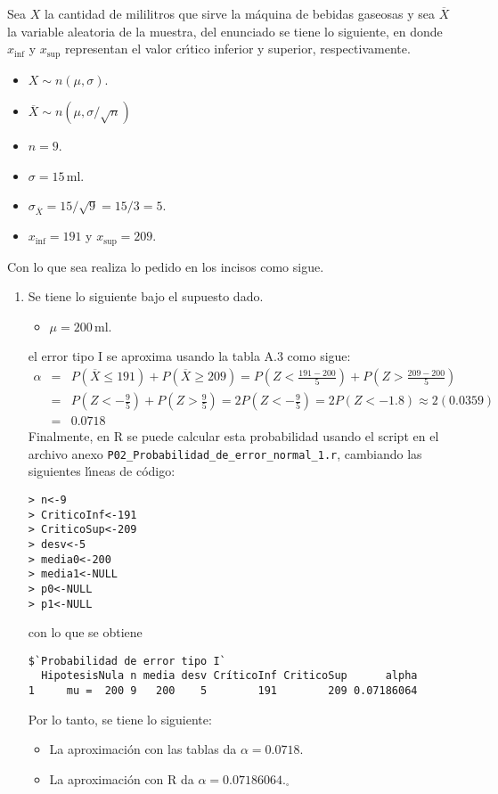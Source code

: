 \begin{solucion}
 Sea $X$ la cantidad de mililitros que sirve la m\'aquina de bebidas gaseosas y sea $\overline{X}$ la variable aleatoria de la muestra, del enunciado se tiene lo siguiente, en donde $x_{\text{inf}}$ y $x_{\text{sup}}$ representan el valor cr\'{\i}tico inferior y superior, respectivamente. 
 \begin{itemize}
  \item $X \sim n(\mu, \sigma)$.
  \item $\overline{X} \sim n\left( \mu, \sigma/\sqrt{n} \right)$
  \item $n = 9$.
  \item $\sigma = 15\,$ml.
  \item $\sigma_{\overline{X}} = 15/\sqrt{9} = 15/3 = 5$.
  \item $x_{\text{inf}} = 191$ y $x_{\text{sup}} = 209$.
 \end{itemize}
 Con lo que sea realiza lo pedido en los incisos como sigue.
 \begin{enumerate}
  \item Se tiene lo siguiente bajo el supuesto dado.
  \begin{itemize}
   \item $\mu = 200\,$ml.
  \end{itemize}
  el error tipo I se aproxima usando la tabla A.3 como sigue:
  \begin{eqnarray*}
   \alpha & = & P\left(\overline{X} \leq 191\right) + P\left(\overline{X} \geq 209\right) = P\left( Z < \frac{191 - 200}{5} \right) + P\left( Z > \frac{209 - 200}{5} \right) \\
   & = & P\left( Z < -\frac{9}{5} \right) + P\left(Z > \frac{9}{5}\right) = 2P\left( Z < -\frac{9}{5} \right) = 2P(Z < -1.8) \approx 2(0.0359) \\ 
   & = & 0.0718
  \end{eqnarray*}
  Finalmente, en R se puede calcular esta probabilidad usando el script en el archivo anexo \texttt{P02\_Probabilidad\_de\_error\_normal\_1.r}, cambiando las siguientes l\'{\i}neas de c\'odigo:
  \begin{verbatim}
> n<-9
> CriticoInf<-191
> CriticoSup<-209
> desv<-5
> media0<-200
> media1<-NULL
> p0<-NULL
> p1<-NULL
  \end{verbatim}
  \vspace{-0.5cm}
  con lo que se obtiene
  \begin{verbatim}
$`Probabilidad de error tipo I`
  HipotesisNula n media desv CríticoInf CriticoSup      alpha
1     mu =  200 9   200    5        191        209 0.07186064
  \end{verbatim}
  \vspace{-0.5cm}
  Por lo tanto, se tiene lo siguiente:
  \begin{itemize}
   \item La aproximaci\'on con las tablas da $\alpha = 0.0718$.
   \item La aproximaci\'on con R da $\alpha = 0.07186064$.${}_{\square}$
  \end{itemize}


\end{enumerate}
\end{solucion}
